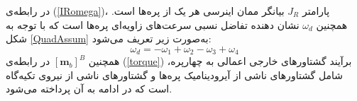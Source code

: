 در رابطه‌ی
(\ref{IRomega})، پارامتر
$J_R$
بیانگر ممان اینرسی هر یک از پره‌ها است. همچنین
$\omega_d$
نشان دهنده تفاضل نسبی سرعت‌های زاویه‌ای پره‌ها است که با توجه به شكل
\ref{QuadAssum}
به‌صورت زیر تعریف می‌شود:
\begin{equation}\label{omega_d}
	\omega_d = -\omega_1 + \omega_2-\omega_3 + \omega_4
\end{equation}
همچنین 
$\left[\boldsymbol m_b\right]^B$
در رابطه‌ی
(\ref{torque})
برآیند گشتاورهای خارجی اعمالی به چهارپره، شامل 
گشتاورهای ناشی از آیرودینامیک پره‌ها و گشتاورهای ناشی از نیروی تكیه‌گاه است که در ادامه به آن پرداخته می‌شود.



